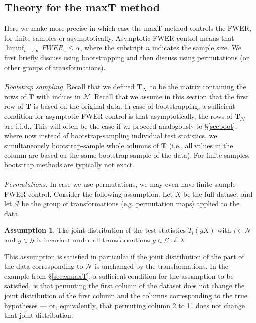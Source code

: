 \documentclass[11pt]{article}
\theoremstyle{plain}
\theoremstyle{definition}
\newtheorem{assumption}{Assumption}[section]
\newcommand{\N}{\mathcal{N}}
\newcommand{\G}{\mathcal{G}}
\begin{document}
\subsection{Theory for the maxT method} \label{secmaxTtheory}
Here we make more precise in which case the maxT method controls the FWER, for finite samples or asymptotically. Asymptotic FWER control means that $\liminf_{n\rightarrow\infty}FWER_n\leq \alpha$, where the substript $n$ indicates the sample size. We first briefly discuss using bootstrapping and then discuss using permutations (or other groups of transformations).
\\
\\
\emph{Bootstrap sampling.}
Recall that we defined $\bm{T}_{\N}$ to be the matrix containing the rows of $\bm{T}$ with indices in $\N$. Recall that we assume in this section that the first row of $\bm{T}$ is based on the original data.
In case of bootstrapping, a sufficient condition for asymptotic FWER control is that asymptotically, the rows of $\bm{T}_{\N}$ are i.i.d.. This will often be the case if we proceed analogously to \S\ref{secboot}, where now instead of bootstrap-sampling individual test statistics, we simultaneously bootstrap-sample whole columns of $\bm{T}$ (i.e., all values in the column are based on the same bootstrap sample of the data). For finite samples, bootstrap methods are typically not exact.
\\
\\
\emph{Permutations.}
In case we use permutations, we may even have finite-sample FWER control. Consider the following assumption.
Let $X$ be the full dataset and let $\G$ be the group of transformations (e.g. permutation maps) applied to the data.
\begin{assumption} \label{assjointd}
The joint distribution of the test statistics $T_i(gX)$ with $i \in \N$ and $g\in \G$ is invariant under all transformations $g\in \G$ of $X$. 
\end{assumption}
This assumption is satisfied in particular if the joint distribution of the part of the data corresponding to $\N$ is unchanged by the transformations.
In the example from \S\ref{secexmaxT}, a sufficient condition for the assumption to be satisfied,  is that permuting the first column of the dataset does not change the joint distribution of the first column and the columns corresponding to the true hypotheses --- or, equivalently, that permuting column 2 to 11 does not change that joint distribution.
\end{document}
